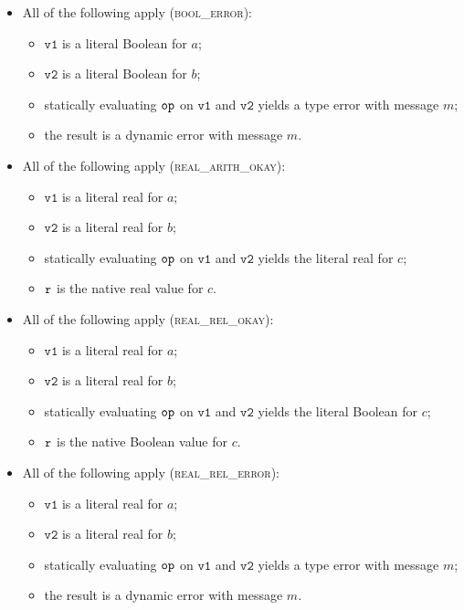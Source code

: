 \documentclass{book}
\newcommand\vvone[0]{\texttt{v1}}
\newcommand\vvtwo[0]{\texttt{v2}}
\begin{document}
\begin{itemize}
  \item All of the following apply (\textsc{bool\_error}):
  \begin{itemize}
    \item $\vvone$ is a literal Boolean for $a$;
    \item $\vvtwo$ is a literal Boolean for $b$;
    \item statically evaluating $\texttt{op}$ on $\vvone$ and $\vvtwo$ yields a type error with message $m$;
    \item the result is a dynamic error with message $m$.
  \end{itemize}

  \item All of the following apply (\textsc{real\_arith\_okay}):
  \begin{itemize}
    \item $\vvone$ is a literal real for $a$;
    \item $\vvtwo$ is a literal real for $b$;
    \item statically evaluating $\texttt{op}$ on $\vvone$ and $\vvtwo$ yields the literal real for $c$;
    \item $\texttt{r}$ is the native real value for $c$.
  \end{itemize}

  \item All of the following apply (\textsc{real\_rel\_okay}):
  \begin{itemize}
    \item $\vvone$ is a literal real for $a$;
    \item $\vvtwo$ is a literal real for $b$;
    \item statically evaluating $\texttt{op}$ on $\vvone$ and $\vvtwo$ yields the literal Boolean for $c$;
    \item $\texttt{r}$ is the native Boolean value for $c$.
  \end{itemize}

  \item All of the following apply (\textsc{real\_rel\_error}):
  \begin{itemize}
    \item $\vvone$ is a literal real for $a$;
    \item $\vvtwo$ is a literal real for $b$;
    \item statically evaluating $\texttt{op}$ on $\vvone$ and $\vvtwo$ yields a type error with message $m$;
    \item the result is a dynamic error with message $m$.
  \end{itemize}


\end{itemize}
\end{document}
